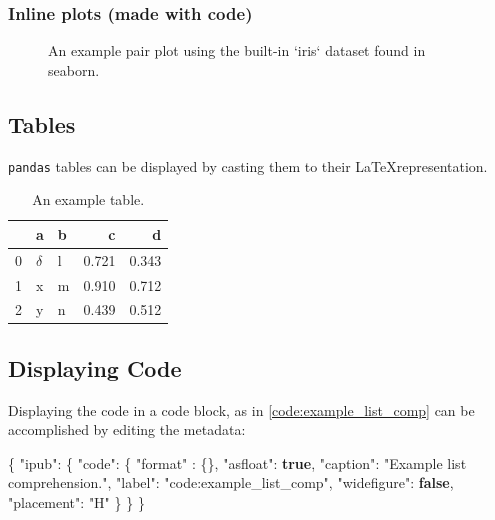\documentclass[10pt,parskip=half,
	toc=sectionentrywithdots,
	bibliography=totocnumbered,
	captions=tableheading,
    numbers=noendperiod,
    headings=standardclasses]{scrartcl}
\newenvironment{Shaded}{}{}
\newcommand{\KeywordTok}[1]{\textcolor[rgb]{0.00,0.44,0.13}{\textbf{{#1}}}}
\newcommand{\DataTypeTok}[1]{\textcolor[rgb]{0.56,0.13,0.00}{{#1}}}
\newcommand{\StringTok}[1]{\textcolor[rgb]{0.25,0.44,0.63}{{#1}}}
\newcommand{\FunctionTok}[1]{\textcolor[rgb]{0.02,0.16,0.49}{{#1}}}
\begin{document}
\subsubsection{Inline plots (made with
code)}\label{inline-plots-made-with-code}

\begin{figure}[H]\begin{center}\end{center}\caption{An example pair plot using the built-in `iris` dataset found in seaborn.}\label{fig:pairplot}
    \end{figure}

\subsection{Tables}\label{tables}

\texttt{pandas} tables can be displayed by casting them to their
\LaTeX representation.

    \begin{table}[H]\caption{An example table.}\label{tbl:exampleTable}

\centering
\begin{adjustbox}{max width=\textwidth}
\begin{tabular}{lllrr}
\toprule
{} &         a &  b &      c &      d \\
\midrule
0 &  $\delta$ &  l &  0.721 &  0.343 \\
1 &         x &  m &  0.910 &  0.712 \\
2 &         y &  n &  0.439 &  0.512 \\
\bottomrule
\end{tabular}

\end{adjustbox}
\end{table}

\subsection{Displaying Code}\label{displaying-code}

Displaying the code in a code block, as in \cref{code:example_list_comp}
can be accomplished by editing the metadata:

\begin{Shaded}
\begin{Highlighting}[]
\FunctionTok{\{}
\DataTypeTok{"ipub"}\FunctionTok{:} \FunctionTok{\{}
  \DataTypeTok{"code"}\FunctionTok{:} \FunctionTok{\{}
  \DataTypeTok{"format"} \FunctionTok{:} \FunctionTok{\{\},}
    \DataTypeTok{"asfloat"}\FunctionTok{:} \KeywordTok{true}\FunctionTok{,}
    \DataTypeTok{"caption"}\FunctionTok{:} \StringTok{"Example list comprehension."}\FunctionTok{,}
    \DataTypeTok{"label"}\FunctionTok{:} \StringTok{"code:example_list_comp"}\FunctionTok{,}
    \DataTypeTok{"widefigure"}\FunctionTok{:} \KeywordTok{false}\FunctionTok{,}
    \DataTypeTok{"placement"}\FunctionTok{:} \StringTok{"H"}
    \FunctionTok{\}}
  \FunctionTok{\}}
\FunctionTok{\}}
\end{Highlighting}
\end{Shaded}
\end{document}
